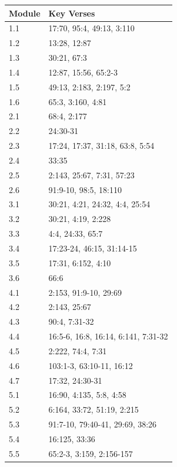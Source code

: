 \documentclass[11pt,a4paper]{article}
\begin{document}
\begin{longtable}{|p{4.5cm}|p{11cm}|}
\hline
\textbf{\color{accent}Module} & \textbf{\color{accent}Key Verses} \\
\hline
1.1 & 17:70, 95:4, 49:13, 3:110 \\
\hline
1.2 & 13:28, 12:87 \\
\hline
1.3 & 30:21, 67:3 \\
\hline
1.4 & 12:87, 15:56, 65:2-3 \\
\hline
1.5 & 49:13, 2:183, 2:197, 5:2 \\
\hline
1.6 & 65:3, 3:160, 4:81 \\
\hline
2.1 & 68:4, 2:177 \\
\hline
2.2 & 24:30-31 \\
\hline
2.3 & 17:24, 17:37, 31:18, 63:8, 5:54 \\
\hline
2.4 & 33:35 \\
\hline
2.5 & 2:143, 25:67, 7:31, 57:23 \\
\hline
2.6 & 91:9-10, 98:5, 18:110 \\
\hline
3.1 & 30:21, 4:21, 24:32, 4:4, 25:54 \\
\hline
3.2 & 30:21, 4:19, 2:228 \\
\hline
3.3 & 4:4, 24:33, 65:7 \\
\hline
3.4 & 17:23-24, 46:15, 31:14-15 \\
\hline
3.5 & 17:31, 6:152, 4:10 \\
\hline
3.6 & 66:6 \\
\hline
4.1 & 2:153, 91:9-10, 29:69 \\
\hline
4.2 & 2:143, 25:67 \\
\hline
4.3 & 90:4, 7:31-32 \\
\hline
4.4 & 16:5-6, 16:8, 16:14, 6:141, 7:31-32 \\
\hline
4.5 & 2:222, 74:4, 7:31 \\
\hline
4.6 & 103:1-3, 63:10-11, 16:12 \\
\hline
4.7 & 17:32, 24:30-31 \\
\hline
5.1 & 16:90, 4:135, 5:8, 4:58 \\
\hline
5.2 & 6:164, 33:72, 51:19, 2:215 \\
\hline
5.3 & 91:7-10, 79:40-41, 29:69, 38:26 \\
\hline
5.4 & 16:125, 33:36 \\
\hline
5.5 & 65:2-3, 3:159, 2:156-157 \\
\hline
\end{longtable}

\vspace{6pt}\noindent{\color{border}\rule{\textwidth}{0.5pt}}\vspace{6pt}
\end{document}
